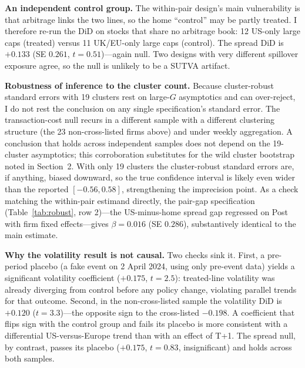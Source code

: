 \documentclass[11pt]{article}
\begin{document}
\textbf{An independent control group.} The within-pair design's
main vulnerability is that arbitrage links the two lines, so the home ``control''
may be partly treated. I therefore re-run the DiD on stocks that share no arbitrage book: 12 US-only large caps (treated) versus 11 UK/EU-only large caps
(control). The spread DiD is $+0.133$ (SE $0.261$, $t=0.51$)---again null. Two designs with very different spillover exposure agree, so the null is unlikely to be a SUTVA artifact.

\textbf{Robustness of inference to the cluster count.} Because cluster-robust
standard errors with 19 clusters rest on large-$G$ asymptotics and can over-reject,
I do not rest the conclusion on any single specification's standard error. The transaction-cost null recurs in a different sample
with a different clustering structure (the 23 non-cross-listed firms above) and
under weekly aggregation. A conclusion that holds across independent samples does
not depend on the 19-cluster asymptotics; this corroboration substitutes for the wild cluster bootstrap noted in Section~2. With only 19
clusters the cluster-robust standard errors are, if anything, biased downward, so the true confidence interval is likely even wider than the
reported $[-0.56,0.58]$, strengthening the imprecision point. As a check matching the within-pair estimand
directly, the pair-gap specification (Table~\ref{tab:robust}, row 2)---the
US-minus-home spread gap regressed on Post with firm fixed effects---gives
$\beta=0.016$ (SE $0.286$), substantively identical to the main estimate.

\textbf{Why the volatility result is not causal.} Two checks sink it. First, a
pre-period placebo (a fake event on 2 April 2024, using only pre-event data) yields
a significant volatility coefficient ($+0.175$, $t=2.5$): treated-line
volatility was already diverging from control before any policy change, violating
parallel trends for that outcome. Second, in the non-cross-listed sample the
volatility DiD is $+0.120$ ($t=3.3$)---the opposite sign to the cross-listed
$-0.198$. A coefficient that flips sign with the control group and fails its
placebo is more consistent with a differential US-versus-Europe trend than with an effect of T+1. The spread
null, by contrast, passes its placebo ($+0.175$, $t=0.83$, insignificant) and holds
across both samples.
\end{document}
